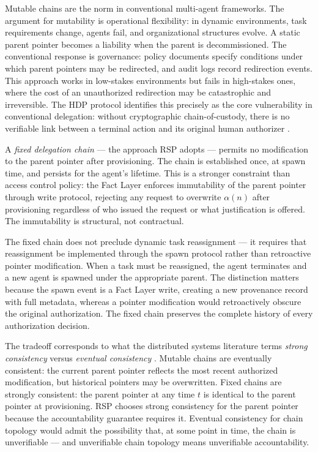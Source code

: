 Mutable chains are the norm in conventional multi-agent frameworks. The argument for mutability is operational flexibility: in dynamic environments, task requirements change, agents fail, and organizational structures evolve. A static parent pointer becomes a liability when the parent is decommissioned. The conventional response is governance: policy documents specify conditions under which parent pointers may be redirected, and audit logs record redirection events. This approach works in low-stakes environments but fails in high-stakes ones, where the cost of an unauthorized redirection may be catastrophic and irreversible. The HDP protocol identifies this precisely as the core vulnerability in conventional delegation: without cryptographic chain-of-custody, there is no verifiable link between a terminal action and its original human authorizer \cite{hdp-draft, hdp-draft-2}.

A \emph{fixed delegation chain} --- the approach RSP adopts --- permits no modification to the parent pointer after provisioning. The chain is established once, at spawn time, and persists for the agent's lifetime. This is a stronger constraint than access control policy: the Fact Layer enforces immutability of the parent pointer through write protocol, rejecting any request to overwrite $\alpha(n)$ after provisioning regardless of who issued the request or what justification is offered. The immutability is structural, not contractual.

The fixed chain does not preclude dynamic task reassignment --- it requires that reassignment be implemented through the spawn protocol rather than retroactive pointer modification. When a task must be reassigned, the agent terminates and a new agent is spawned under the appropriate parent. The distinction matters because the spawn event is a Fact Layer write, creating a new provenance record with full metadata, whereas a pointer modification would retroactively obscure the original authorization. The fixed chain preserves the complete history of every authorization decision.

The tradeoff corresponds to what the distributed systems literature terms \emph{strong consistency} versus \emph{eventual consistency} \cite{vogels2009eventual}. Mutable chains are eventually consistent: the current parent pointer reflects the most recent authorized modification, but historical pointers may be overwritten. Fixed chains are strongly consistent: the parent pointer at any time $t$ is identical to the parent pointer at provisioning. RSP chooses strong consistency for the parent pointer because the accountability guarantee requires it. Eventual consistency for chain topology would admit the possibility that, at some point in time, the chain is unverifiable --- and unverifiable chain topology means unverifiable accountability.

